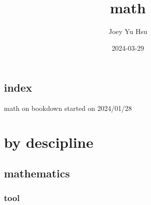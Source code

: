 \documentclass[
]{book}
\title{math}
\author{Joey Yu Hsu}
\date{2024-03-29}
\theoremstyle{definition}
\theoremstyle{definition}
\theoremstyle{definition}
\theoremstyle{definition}
\theoremstyle{remark}
\begin{document}
\maketitle

{
\hypersetup{linkcolor=}
\setcounter{tocdepth}{4}
\tableofcontents
}
\chapter*{index}\label{index}

math on bookdown started on 2024/01/28

\part{by descipline}\label{part-by-descipline}

\chapter{mathematics}\label{mathematics}

\section{tool}\label{tool}
\end{document}
